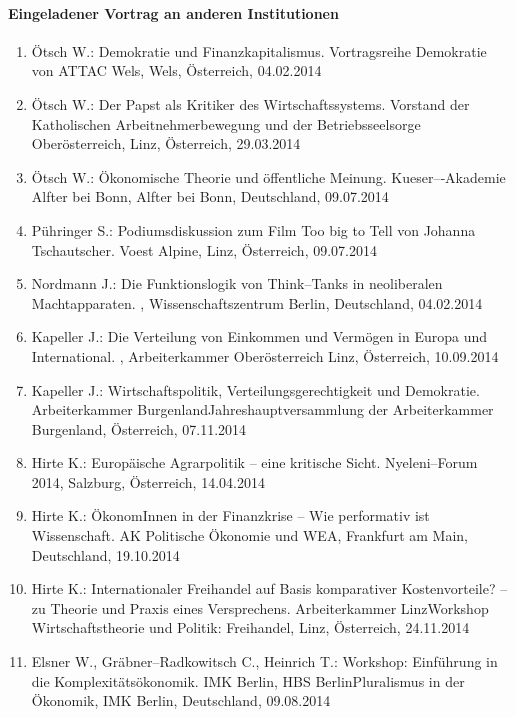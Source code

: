 \paragraph{Eingeladener Vortrag an anderen Institutionen}
\begin{enumerate}
	\item Ötsch W.: Demokratie und Finanzkapitalismus. Vortragsreihe Demokratie von ATTAC Wels, Wels, Österreich, 04.02.2014
	\item Ötsch W.: Der Papst als Kritiker des Wirtschaftssystems. Vorstand der Katholischen Arbeitnehmerbewegung und der Betriebsseelsorge Oberösterreich, Linz, Österreich, 29.03.2014
	\item Ötsch W.: Ökonomische Theorie und öffentliche Meinung. Kueser--­‐Akademie Alfter bei Bonn, Alfter bei Bonn, Deutschland, 09.07.2014
	\item Pühringer S.: Podiumsdiskussion zum Film Too big to Tell von Johanna Tschautscher. Voest Alpine, Linz, Österreich, 09.07.2014
	\item Nordmann J.: Die Funktionslogik von Think--Tanks in neoliberalen Machtapparaten. , Wissenschaftszentrum Berlin, Deutschland, 04.02.2014
	\item Kapeller J.: Die Verteilung von Einkommen und Vermögen in Europa und International. , Arbeiterkammer Oberösterreich Linz, Österreich, 10.09.2014
	\item Kapeller J.: Wirtschaftspolitik, Verteilungsgerechtigkeit und Demokratie. Arbeiterkammer BurgenlandJahreshauptversammlung der Arbeiterkammer Burgenland, Österreich, 07.11.2014
	\item Hirte K.: Europäische Agrarpolitik – eine kritische Sicht. Nyeleni--Forum 2014, Salzburg, Österreich, 14.04.2014
	\item Hirte K.: ÖkonomInnen in der Finanzkrise -- Wie performativ ist Wissenschaft. AK Politische Ökonomie und WEA, Frankfurt am Main, Deutschland, 19.10.2014
	\item Hirte K.: Internationaler Freihandel auf Basis komparativer Kostenvorteile? -- zu Theorie und Praxis eines Versprechens. Arbeiterkammer LinzWorkshop Wirtschaftstheorie und Politik: Freihandel, Linz, Österreich, 24.11.2014
	\item Elsner W., Gräbner--Radkowitsch C., Heinrich T.: Workshop: Einführung in die Komplexitätsökonomik. IMK Berlin, HBS BerlinPluralismus in der Ökonomik, IMK Berlin, Deutschland, 09.08.2014
\end{enumerate}
